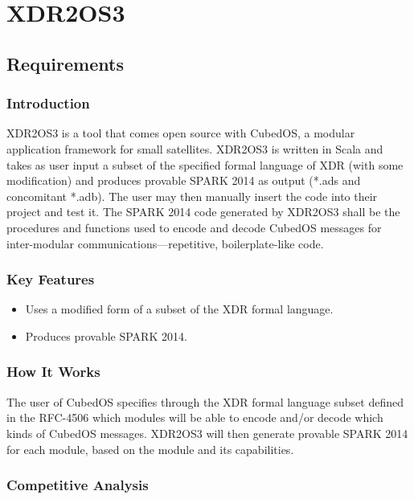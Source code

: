 \chapter{XDR2OS3}
\label{chapter-xdr2os3}

\section{Requirements}

\subsection{Introduction}

XDR2OS3 is a tool that comes open source with CubedOS, a modular application framework for small
satellites. XDR2OS3 is written in Scala and takes as user input a subset of the specified formal
language of XDR (with some modification) and produces provable SPARK 2014 as output (*.ads and
concomitant *.adb). The user may then manually insert the code into their project and test it.
The SPARK 2014 code generated by XDR2OS3 shall be the procedures and functions used to encode
and decode CubedOS messages for inter-modular communications—repetitive, boilerplate-like code.

\subsection{Key Features}

\begin{itemize}
\item Uses a modified form of a subset of the XDR formal language.
\item Produces provable SPARK 2014.
\end{itemize}

\subsection{How It Works}

The user of CubedOS specifies through the XDR formal language subset defined in the RFC-4506
which modules will be able to encode and/or decode which kinds of CubedOS messages. XDR2OS3 will
then generate provable SPARK 2014 for each module, based on the module and its capabilities.

\subsection{Competitive Analysis}

